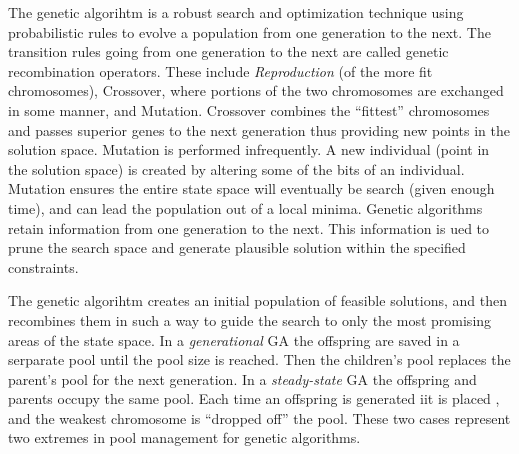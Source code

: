 \documentclass[pdftex,11pt]{article}
\begin{document}
The genetic algorihtm is a robust search and optimization technique using probabilistic rules to evolve a population from one generation to the next. The transition rules going from one generation to the next are called genetic recombination operators. These include \emph{Reproduction} (of the more fit chromosomes), Crossover, where portions of the two chromosomes are exchanged in some manner, and Mutation. Crossover combines the ``fittest'' chromosomes and passes superior genes to the next generation thus providing new points in the solution space. Mutation is performed infrequently. A new individual (point in the solution space) is created by altering some of the bits of an individual. Mutation ensures the entire state space will eventually be search (given enough time), and can lead the population out of a local minima. Genetic algorithms retain information from one generation to the next. This information is ued to prune the search space and generate plausible solution within the specified constraints.

The genetic algorihtm creates an initial population of feasible solutions, and then recombines them in such a way to guide the search to only the most promising areas of the state space. In a \emph{generational} GA the offspring are saved in a serparate pool until the pool size is reached. Then the children's pool replaces the parent's pool for the next generation. In a \emph{steady-state} GA the offspring and parents occupy the same pool. Each time an offspring is generated iit is placed , and the weakest chromosome is ``dropped off'' the pool. These two cases represent two extremes in pool management for genetic algorithms.
\end{document}
